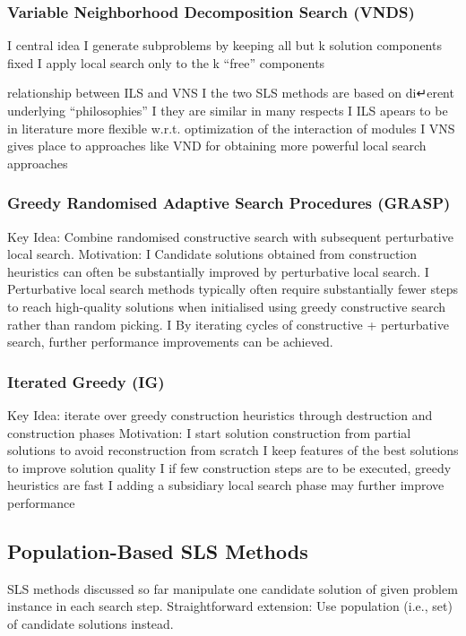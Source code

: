 \documentclass[a4paper,10pt]{article}
\begin{document}
		\subsubsection{Variable Neighborhood Decomposition Search (VNDS)}
I central idea
I generate subproblems by keeping all but k solution
components fixed
I apply local search only to the k “free” components
		
		relationship between ILS and VNS
I the two SLS methods are based on di↵erent underlying “philosophies”
I they are similar in many respects
I ILS apears to be in literature more flexible w.r.t. optimization
of the interaction of modules
I VNS gives place to approaches like VND for obtaining more powerful local search approaches
		
		
		\subsubsection{Greedy Randomised Adaptive Search Procedures (GRASP)}	
Key Idea: Combine randomised constructive search with subsequent perturbative local search.
Motivation:
I Candidate solutions obtained from construction heuristics can often be substantially improved by perturbative local search.
I Perturbative local search methods typically often require substantially fewer steps to reach high-quality solutions when initialised using greedy constructive search rather than random picking.
I By iterating cycles of constructive + perturbative search, further performance improvements can be achieved.
				
	\subsubsection{Iterated Greedy (IG)}
Key Idea: iterate over greedy construction heuristics through destruction and construction phases
Motivation:
I start solution construction from partial solutions to avoid reconstruction from scratch
I keep features of the best solutions to improve solution quality I if few construction steps are to be executed, greedy heuristics
are fast
I adding a subsidiary local search phase may further improve performance
		
		
	\subsection{Population-Based SLS Methods}
	SLS methods discussed so far manipulate one candidate solution of given problem instance in each search step.
Straightforward extension: Use population (i.e., set) of candidate solutions instead.
	
\end{document}
